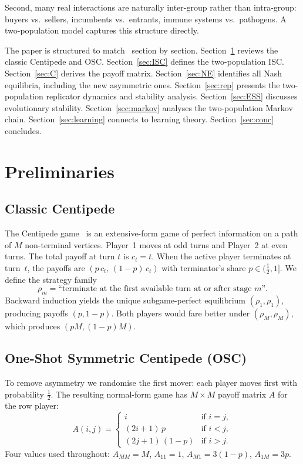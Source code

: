 \documentclass[12pt,a4paper]{article}
\begin{document}
Second, many real interactions are naturally inter-group rather than
intra-group: buyers vs.\ sellers, incumbents vs.\ entrants, immune systems vs.\
pathogens.  A two-population model captures this structure directly.

The paper is structured to match~\cite{LK2026} section by section.
Section~\ref{sec:prelim} reviews the classic Centipede and OSC.
Section~\ref{sec:ISC} defines the two-population ISC.
Section~\ref{sec:C} derives the payoff matrix.
Section~\ref{sec:NE} identifies all Nash equilibria, including the new
asymmetric ones.
Section~\ref{sec:rep} presents the two-population replicator dynamics and
stability analysis.
Section~\ref{sec:ESS} discusses evolutionary stability.
Section~\ref{sec:markov} analyses the two-population Markov chain.
Section~\ref{sec:learning} connects to learning theory.
Section~\ref{sec:conc} concludes.

\section{Preliminaries}
\label{sec:prelim}

\subsection{Classic Centipede}

The Centipede game~\cite{Rosenthal1981} is an extensive-form game of perfect
information on a path of $M$ non-terminal vertices.
Player~1 moves at odd turns and Player~2 at even turns.  The total payoff at
turn $t$ is $c_t = t$.  When the active player terminates at turn~$t$, the
payoffs are $(p\,c_t,\,(1-p)\,c_t)$ with terminator's share
$p\in(\tfrac{1}{2},1]$.  We define the strategy family
\[
  \rho_m = \text{``terminate at the first available turn at or after stage~}m\text{''.}
\]
Backward induction yields the unique subgame-perfect equilibrium $(\rho_1,\rho_1)$,
producing payoffs $(p,1-p)$.  Both players would fare better under $(\rho_M,\rho_M)$,
which produces $(pM,(1-p)M)$.

\subsection{One-Shot Symmetric Centipede (OSC)}

To remove asymmetry we randomise the first mover: each player moves first with
probability $\tfrac{1}{2}$.  The resulting normal-form game has
$M\times M$ payoff matrix $A$ for the row player:
\begin{equation}\label{eq:A}
  A(i,j)=\begin{cases}
    i & \text{if }i=j,\\
    (2i+1)\,p & \text{if }i<j,\\
    (2j+1)\,(1-p) & \text{if }i>j.
  \end{cases}
\end{equation}
Four values used throughout:
$A_{MM}=M$, $A_{11}=1$, $A_{M1}=3(1-p)$, $A_{1M}=3p$.
\end{document}
